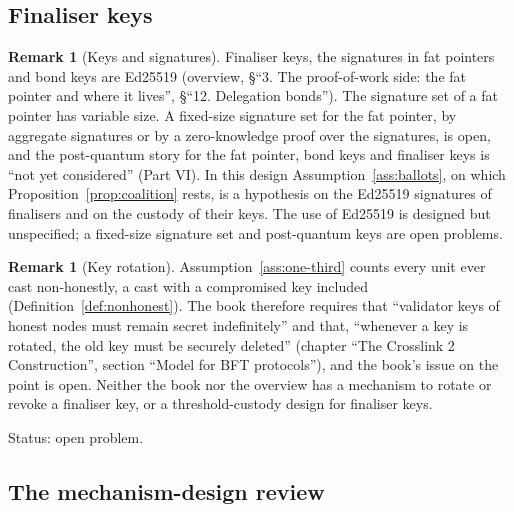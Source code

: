 \documentclass[11pt,a4paper]{article}
\theoremstyle{definition}
\newtheorem{remark}[theorem]{Remark}
\begin{document}
\subsection{Finaliser keys}\label{sec:fs-keys}

\begin{remark}[Keys and signatures]\label{rem:keys}
Finaliser keys, the signatures in fat pointers and bond keys are Ed25519
(overview, \S``3. The proof-of-work side: the fat pointer and where it
lives'', \S``12. Delegation bonds''). The signature set of a fat pointer has
variable size. A fixed-size signature set for the fat pointer, by aggregate
signatures or by a zero-knowledge proof over the signatures, is open, and the
post-quantum story for the fat pointer, bond keys and finaliser keys is ``not
yet considered'' (Part VI). In this design Assumption~\ref{ass:ballots}, on
which Proposition~\ref{prop:coalition} rests, is a hypothesis on the Ed25519
signatures of finalisers and on the custody of their keys. The use of
Ed25519 is designed but unspecified; a fixed-size signature set and
post-quantum keys are open problems.
\end{remark}

\begin{remark}[Key rotation]\label{rem:key-rotation}
Assumption~\ref{ass:one-third} counts every unit ever cast non-honestly, a
cast with a compromised key included (Definition~\ref{def:nonhonest}). The
book therefore requires that ``validator keys of honest nodes must remain
secret indefinitely'' and that, ``whenever a key is rotated, the old key must
be securely deleted'' (chapter ``The Crosslink 2 Construction'', section
``Model for BFT protocols''), and the book's issue on the point is open.
Neither the book nor the overview has a mechanism to rotate or revoke a
finaliser key, or a threshold-custody design for finaliser keys.

Status: open problem.
\end{remark}

\subsection{The mechanism-design review}\label{sec:fs-review}
\end{document}
